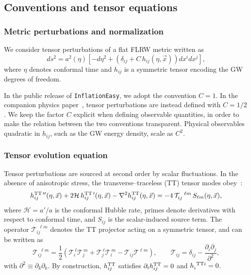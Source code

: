 \documentclass[aps, nofootinbib,superscriptaddress, preprintnumbers, longbibliography]{article}
\begin{document}
\subsection{Conventions and tensor equations}

\subsubsection*{Metric perturbations and normalization}

We consider tensor perturbations of a flat FLRW metric written as
\begin{equation}
\label{eq:GW_metric}
ds^2
=
a^2(\eta)\left[
- d\eta^2
+ \left(\delta_{ij} + C\,h_{ij}(\eta,\vec{x})\right) dx^i dx^j
\right],
\end{equation}
where $\eta$ denotes conformal time and $h_{ij}$ is a symmetric tensor encoding the GW degrees of freedom.

In the public release of \texttt{InflationEasy}, we adopt the convention $C=1$. In the companion physics paper~\cite{gwpaper}, tensor perturbations are instead defined with $C=1/2$. We keep the factor $C$ explicit when defining observable quantities, in order to make the relation between the two conventions transparent. Physical observables quadratic in $h_{ij}$, such as the GW energy density, scale as $C^2$.


\subsubsection*{Tensor evolution equation}

Tensor perturbations are sourced at second order by scalar fluctuations. In the absence of anisotropic stress, the transverse--traceless (TT) tensor modes obey~\cite{Acquaviva:2002ud, Mollerach:2003nq, Ananda:2006af, Baumann:2007zm}:
\begin{equation}
\label{eq:GW_eom}
h_{ij}^{{\rm TT}\,\prime\prime}(\eta,\vec{x})
+2\mathcal{H}\,h_{ij}^{{\rm TT}\,\prime}(\eta,\vec{x})
-\nabla^2 h_{ij}^{\rm TT}(\eta,\vec{x})
=
-4\,\mathcal{T}_{ij}^{\ \ \ell m}\,S_{\ell m}(\eta,\vec{x}),
\end{equation}
where $\mathcal{H}=a'/a$ is the conformal Hubble rate, primes denote derivatives with respect to conformal time, and $S_{ij}$ is the scalar-induced source term. The operator $\mathcal{T}_{ij}^{\ \ \ell m}$ denotes the TT projector acting on a symmetric tensor, and can be written as
\begin{equation}
\label{eq:GW_TT_operator}
\mathcal{T}_{ij}^{\ \ \ell m}
=
\frac12\left(
\mathcal{T}_i^{\ \ell}\mathcal{T}_j^{\ m}
+\mathcal{T}_j^{\ \ell}\mathcal{T}_i^{\ m}
-\mathcal{T}_{ij}\mathcal{T}^{\ell m}
\right),
\qquad
\mathcal{T}_{ij}
=
\delta_{ij}-\frac{\partial_i\partial_j}{\partial^2},
\end{equation}
with $\partial^2\equiv \partial_k\partial_k$. By construction, $h_{ij}^{\rm TT}$ satisfies $\partial_i h_{ij}^{\rm TT}=0$ and $h_{i}^{\ {\rm TT}i}=0$.
\end{document}

